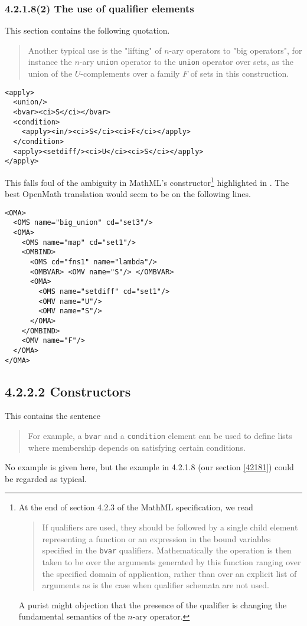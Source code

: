 \documentclass{llncs}
\begin{document}
{\subsubsection{4.2.1.8(2) The use of qualifier elements}\label{42182}
This section contains the following quotation.
\begin{quotation}\noindent
Another typical use is the "lifting" of $n$-ary operators to "big operators",
for instance the $n$-ary {\tt union} operator to the {\tt union} operator over
sets, as the union of the $U$-complements over a family $F$ of sets in this
construction.
\end{quotation} 
\begin{lstlisting}[language=MathML2]
<apply>
  <union/>
  <bvar><ci>S</ci></bvar>
  <condition>
    <apply><in/><ci>S</ci><ci>F</ci></apply>
  </condition>
  <apply><setdiff/><ci>U</ci><ci>S</ci></apply>
</apply>
\end{lstlisting}
This falls foul of the ambiguity in MathML's {}
constructor\footnote{At the end of section 4.2.3 of the MathML specification,
we read
\begin{quotation}\noindent
If qualifiers are used, they should be followed by a single child element
representing a function or an expression in the bound variables specified in
the {\tt bvar} qualifiers.
Mathematically the operation is then taken to be over the arguments generated
by this function ranging over the specified domain of application, rather than
over an explicit list of arguments as is the case when qualifier schemata are
not used. 
\end{quotation}
A purist might objection that the presence of the qualifier is changing the
fundamental semantics of the $n$-ary operator.}
highlighted in \cite[especially slide 14]{Davenportminor2008}. The best OpenMath
translation would seem to be on the following lines.
\begin{lstlisting}
<OMA>
  <OMS name="big_union" cd="set3"/>
  <OMA>
    <OMS name="map" cd="set1"/>
    <OMBIND>
      <OMS cd="fns1" name="lambda"/>
      <OMBVAR> <OMV name="S"/> </OMBVAR>
      <OMA>
        <OMS name="setdiff" cd="set1"/>
        <OMV name="U"/>
        <OMV name="S"/>
      </OMA>
    </OMBIND>
    <OMV name="F"/>
  </OMA>
</OMA>
\end{lstlisting}
\subsection{4.2.2.2 Constructors}\label{4222}
This contains the sentence
\begin{quotation}\noindent
For example, a {\tt bvar} and a {\tt condition} element can be used to define
lists where membership depends on satisfying certain conditions. 
\end{quotation}
No example is given here, but the example in 4.2.1.8 (our section \ref{42181})
could be regarded as typical.
}
\end{document}
